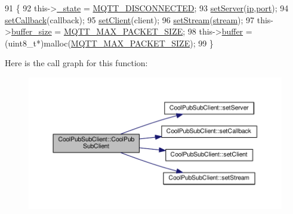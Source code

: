 \begin{DoxyCode}
91                                                                                                            
                 \{
92     this->\hyperlink{class_cool_pub_sub_client_aa1953b601206252a30efa5b114eb3e1a}{\_state} = \hyperlink{_cool_pub_sub_client_8h_adaf86a906a305dd129164982d50111b3}{MQTT\_DISCONNECTED};
93     \hyperlink{class_cool_pub_sub_client_a947e70c394c66c7d08d0c53caf8425e3}{setServer}(\hyperlink{class_cool_pub_sub_client_adabd958c6c3462433a3f3393f40a0966}{ip},\hyperlink{class_cool_pub_sub_client_a01e3249102c057756af7a515c179844e}{port});
94     \hyperlink{class_cool_pub_sub_client_ac5cab7658f1bdded32131241e468e661}{setCallback}(callback);
95     \hyperlink{class_cool_pub_sub_client_a7ee119b786010561ab6a9afa0798e91d}{setClient}(client);
96     \hyperlink{class_cool_pub_sub_client_ae97e40823ea689ff9e36d5bdd71bb933}{setStream}(\hyperlink{class_cool_pub_sub_client_a7a92417b317e7bd9502ed37752111705}{stream});
97     this->\hyperlink{class_cool_pub_sub_client_ae6cb10e42c057483d53516ac830ab526}{buffer\_size} = \hyperlink{_cool_pub_sub_client_8h_ae09b594688a59f1427c7e45259e039b9}{MQTT\_MAX\_PACKET\_SIZE};
98     this->\hyperlink{class_cool_pub_sub_client_a7e8bcc6096626916046a51bebadc7851}{buffer} = (uint8\_t*)malloc(\hyperlink{_cool_pub_sub_client_8h_ae09b594688a59f1427c7e45259e039b9}{MQTT\_MAX\_PACKET\_SIZE});
99 \}
\end{DoxyCode}
Here is the call graph for this function\+:\nopagebreak
\begin{figure}[H]
\begin{center}
\leavevmode
\includegraphics[width=350pt]{d8/d4b/class_cool_pub_sub_client_a08309a2cf058099fa5c96c198f777647_cgraph}
\end{center}
\end{figure}
\mbox{\label{class_cool_pub_sub_client_a469eefe7429f0cbb6d7d443b52488411}} 
